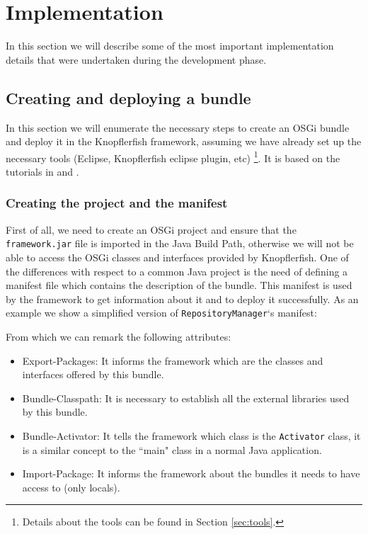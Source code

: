 \section{Implementation}
\label{sec:implementation}

In this section we will describe some of the most important implementation
details that were undertaken during the development phase.

\subsection{Creating and deploying a bundle}
\label{subsec:creating-bundles}

In this section we will enumerate the necessary steps to create
an OSGi bundle and deploy it in the Knopflerfish framework, assuming we have 
already set up the necessary tools (Eclipse, Knopflerfish eclipse plugin, etc)
\footnote{Details about the tools can be found in Section \ref{sec:tools}.}.
It is based on the tutorials in \cite{osgi-tutorial} and \cite{osgi09}.


\subsubsection{Creating the project and the manifest}
First of all, we need to create an OSGi project and ensure that the
\verb|framework.jar| file is imported in the Java Build Path, otherwise we will
not be able to access the OSGi classes and interfaces provided by Knopflerfish.
\newline
One of the differences with respect to a common Java project is the need of
defining a manifest file which contains the description of the bundle. This
manifest is used by the framework to get information about it and to deploy it
successfully. 
As an example we show a simplified version of \verb|RepositoryManager|`s
manifest:



From which we can remark the following attributes:
\begin{itemize}
  \item Export-Packages: It informs the framework which are the classes and
  interfaces offered by this bundle.
  \item Bundle-Classpath: It is necessary to establish all the external
  libraries used by this bundle.
  \item Bundle-Activator: It tells the framework which class is the
  \verb|Activator| class, it is a similar concept to the ``main" class in a
  normal Java application.
  \item Import-Package: It informs the framework about the bundles it needs to
  have access to (only locals). 
\end{itemize}

